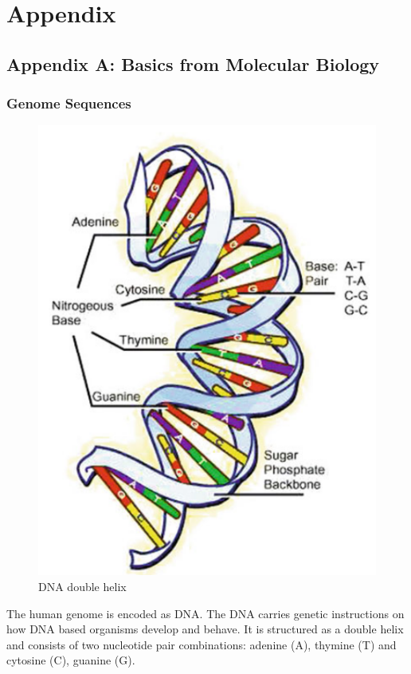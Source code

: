 \section{Appendix}

\subsection{Appendix A: Basics from Molecular Biology} \label{fundamentalsA}

\subsubsection{Genome Sequences} \label{fundamentalsAa}

\begin{figure}
	\centering
	\includegraphics[width=0.9\linewidth]{figures/dnaDoubleHelix.png}
	\caption{\ac{DNA} double helix \cite[p. 8]{10.5555/1965281}}
	\label{dna_double_helix}
\end{figure}

The human genome is encoded as \ac{DNA}. The \ac{DNA} carries genetic instructions on how \ac{DNA} based organisms develop and behave. It is structured as a double helix and consists of two nucleotide pair combinations: adenine (A), thymine (T) and cytosine (C), guanine (G). \cite[p. 8]{10.5555/1965281}

